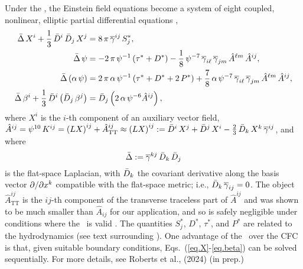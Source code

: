 Under the \xcfc, the Einstein field equations become a system of eight
coupled, nonlinear, elliptic partial differential equations \citep{ccd2009},
\begin{subequations}
  \begin{align}
    \bar{\Delta}\,X^{i}+\frac{1}{3}\,\bar{D}^{i}\,\bar{D}_{j}\,X^{j}
    &=8\,\pi\,\overline{\gamma}^{ij}\,S^{*}_{j},\label{eq.X}\\
    \bar{\Delta}\,\psi&=-2\,\pi\,\psi^{-1}\left(\tau^{*}+D^{*}\right)
    -\frac{1}{8}\,\psi^{-7}\,\overline{\gamma}_{i\ell}\,\overline{\gamma}_{jm}\,
    \hat{A}^{\ell m}\,\hat{A}^{ij},\label{eq.psi}\\
    \bar{\Delta}\left(\alpha\,\psi\right)&=2\,\pi\,\alpha\,\psi^{-1}
    \left(\tau^{*}+D^{*}+2\,P^{*}\right)+\frac{7}{8}\,\alpha\,\psi^{-7}\,
    \overline{\gamma}_{i\ell}\,\overline{\gamma}_{jm}\,\hat{A}^{\ell m}\,\hat{A}^{ij},
    \label{eq.alphaPsi}\\
    \bar{\Delta}\,\beta^{i}
    +\frac{1}{3}\,\bar{D}^{i}\left(\bar{D}_{j}\,\beta^{j}\right)&=
    \bar{D}_{j}\left(2\,\alpha\,\psi^{-6}\hat{A}^{ij}\right),\label{eq.beta}
  \end{align}
\end{subequations}
where $X^{i}$ is the $i$-th component of an auxiliary vector field,
$\hat{A}^{ij}=\psi^{10}\,K^{ij}
=\left(LX\right)^{ij}+\hat{A}^{ij}_{\mathrm{TT}}\approx
\left(LX\right)^{ij}:=\bar{D}^{i}\,X^{j}+\bar{D}^{j}\,X^{i}
-\frac{2}{3}\,\bar{D}_{k}\,X^{k}\,\overline{\gamma}^{ij}$, and where
\begin{equation}
  \bar{\Delta}:=\overline{\gamma}^{kj}\,\bar{D}_{k}\,\bar{D}_{j}
\end{equation}
is the flat-space Laplacian, with $\bar{D}_{k}$ the covariant derivative
along the basis vector $\partial/\partial x^{k}$
compatible with the flat-space metric;
i.e., $\bar{D}_{k}\,\overline{\gamma}_{ij}=0$.
The object $\hat{A}^{ij}_{\mathrm{TT}}$ is the $ij$-th component of the
transverse traceless part of $\hat{A}^{ij}$ and was shown to be much
smaller than $\hat{A}_{ij}$ for our application,
and so is safely negligible under conditions
where the \xcfc\ is valid \citep{ccd2009}.
The quantities $S^{*}_{j}$, $D^{*}$, $\tau^{*}$, and $P^{*}$ are related to the
hydrodynamics (see text surrounding ).
One advantage of the \xcfc\ over the CFC is that,
given suitable boundary conditions,
Eqs.~(\ref{eq.X}-\ref{eq.beta}) can be solved sequentially.
For more details, see Roberts et al., (2024) (in prep.)

